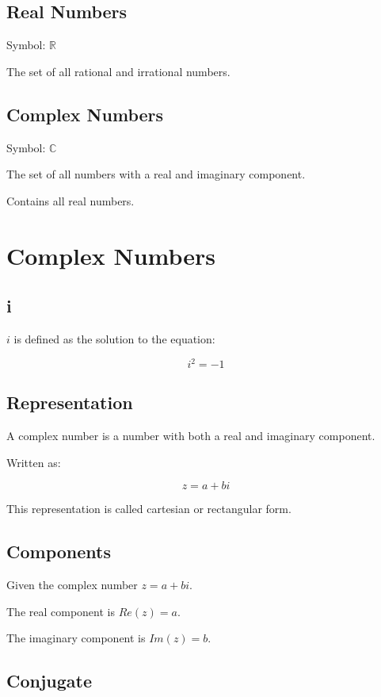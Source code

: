 \documentclass[a4paper,11pt]{report}
\begin{document}
\subsection{Real Numbers}

Symbol: $\mathbb{R}$

The set of all rational and irrational numbers.

\subsection{Complex Numbers}

Symbol: $\mathbb{C}$

The set of all numbers with a real and imaginary component.

Contains all real numbers.


\section{Complex Numbers}

\subsection{i}

$i$ is defined as the solution to the equation:

$$
i^2 = -1
$$

\subsection{Representation}

A complex number is a number with both a real and imaginary component.

Written as:

$$
z = a + bi
$$

This representation is called cartesian or rectangular form.

\subsection{Components}

Given the complex number $z = a + bi$.

The real component is $Re(z) = a$.

The imaginary component is $Im(z) = b$.

\subsection{Conjugate}
\end{document}
